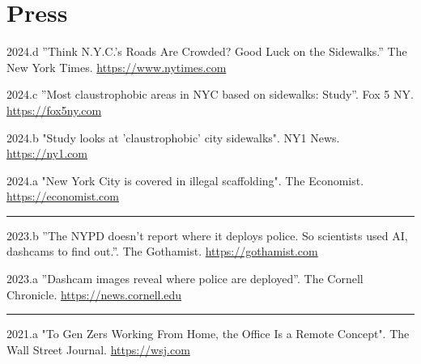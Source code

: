 \documentclass[11pt,letterpaper]{report}
\begin{document}
    \clearpage
    \section*{Press}
        \begin{tablist}
            
            \item[2024.d] \tab{}”Think N.Y.C.’s Roads Are Crowded? Good Luck on the Sidewalks.” The New York Times. \href{https://www.nytimes.com/2024/07/29/nyregion/street-wars-crowded-sidewalks-times-square.html}{https://www.nytimes.com}

            \item[2024.c] \tab{}”Most claustrophobic areas in NYC based on sidewalks: Study”. Fox 5 NY. \href{https://www.fox5ny.com/news/here-most-crowded-sidewalks-nyc}{https://fox5ny.com} 

            \item[2024.b] \tab{}"Study looks at 'claustrophobic' city sidewalks". NY1 News. \href{https://ny1.com/nyc/all-boroughs/CTV/2024/08/03/study-looks-at--claustrophobic--city-sidewalks.}{https://ny1.com}

            \item[2024.a] \tab{}"New York City is covered in illegal scaffolding". The Economist. \href{https://www.economist.com/science-and-technology/2024/03/13/new-york-city-is-covered-in-illegal-scaffolding}{https://economist.com}

            \item[\rule{2em}{0.4pt}]

            \item[2023.b] \tab{}”The NYPD doesn’t report where it deploys police. So scientists used AI, dashcams to find out.”. The Gothamist. \href{https://gothamist.com/news/nypd-does-not-report-where-it-deploys-police-scientists-used-ai-dashcams-to-find-out}{https://gothamist.com}

            \item[2023.a] \tab{} ”Dashcam images reveal where police are deployed”. The Cornell Chronicle. \href{https://news.cornell.edu/stories/2023/07/dashcam-images-reveal-where-police-are-deployed}{https://news.cornell.edu}

            \item[\rule{2em}{0.4pt}]

            \item[2021.a] \tab{} "To Gen Zers Working From Home, the Office Is a Remote Concept". The Wall Street Journal. \href{https://www.wsj.com/articles/to-gen-zers-working-from-home-the-office-is-a-remote-concept-11629538204}{https://wsj.com}
            
        \end{tablist}
\end{document}
